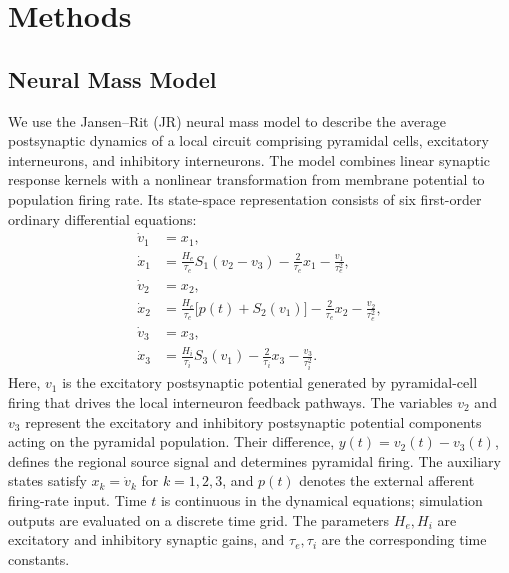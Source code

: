 \documentclass{article}
\begin{document}
\section{Methods}
\subsection{Neural Mass Model}
\label{sec:jr_local_model}
We use the Jansen--Rit (JR) neural mass model \citep{jansen1995electroencephalogram} to describe the average postsynaptic dynamics of a local circuit comprising pyramidal cells, excitatory interneurons, and inhibitory interneurons. The model combines linear synaptic response kernels with a nonlinear transformation from membrane potential to population firing rate. Its state-space representation consists of six first-order ordinary differential equations:
\begin{align}
\dot v_1 &= x_1,
\tag{1.1}\label{eq:jr_v1}\\
\dot x_1 &= \frac{H_e}{\tau_e}S_1(v_2-v_3)
-\frac{2}{\tau_e}x_1-\frac{v_1}{\tau_e^2},
\tag{1.2}\label{eq:jr_x1}\\
\dot v_2 &= x_2,
\tag{1.3}\label{eq:jr_v2}\\
\dot x_2 &= \frac{H_e}{\tau_e}\bigl[p(t)+S_2(v_1)\bigr]
-\frac{2}{\tau_e}x_2-\frac{v_2}{\tau_e^2},
\tag{1.4}\label{eq:jr_x2}\\
\dot v_3 &= x_3,
\tag{1.5}\label{eq:jr_v3}\\
\dot x_3 &= \frac{H_i}{\tau_i}S_3(v_1)
-\frac{2}{\tau_i}x_3-\frac{v_3}{\tau_i^2}.
\tag{1.6}\label{eq:jr_x3}
\end{align}
Here, $v_1$ is the excitatory postsynaptic potential generated by pyramidal-cell firing that drives the local interneuron feedback pathways. The variables $v_2$ and $v_3$ represent the excitatory and inhibitory postsynaptic potential components acting on the pyramidal population. Their difference, $y(t)=v_2(t)-v_3(t)$, defines the regional source signal and determines pyramidal firing. The auxiliary states satisfy $x_k=\dot v_k$ for $k=1,2,3$, and $p(t)$ denotes the external afferent firing-rate input. Time $t$ is continuous in the dynamical equations; simulation outputs are evaluated on a discrete time grid. The parameters $H_e,H_i$ are excitatory and inhibitory synaptic gains, and $\tau_e,\tau_i$ are the corresponding time constants.
\end{document}
